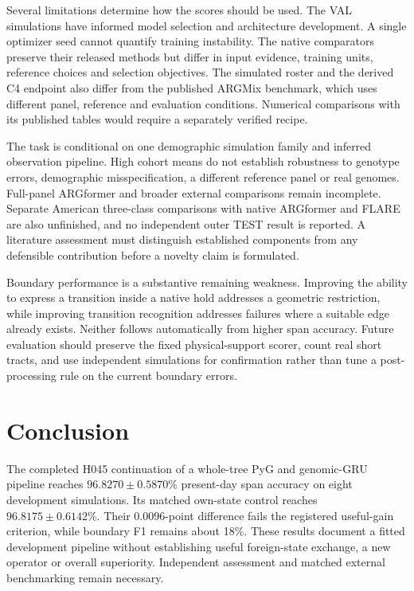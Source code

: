 \documentclass[letterpaper]{article}
\begin{document}
Several limitations determine how the scores should be used. The VAL simulations have informed model selection and architecture development. A single optimizer seed cannot quantify training instability. The native comparators preserve their released methods but differ in input evidence, training units, reference choices and selection objectives. The simulated roster and the derived C4 endpoint also differ from the published ARGMix benchmark, which uses different panel, reference and evaluation conditions. Numerical comparisons with its published tables would require a separately verified recipe.

The task is conditional on one demographic simulation family and inferred observation pipeline. High cohort means do not establish robustness to genotype errors, demographic misspecification, a different reference panel or real genomes. Full-panel ARGformer and broader external comparisons remain incomplete. Separate American three-class comparisons with native ARGformer and FLARE are also unfinished, and no independent outer TEST result is reported. A literature assessment must distinguish established components from any defensible contribution before a novelty claim is formulated.

Boundary performance is a substantive remaining weakness. Improving the ability to express a transition inside a native hold addresses a geometric restriction, while improving transition recognition addresses failures where a suitable edge already exists. Neither follows automatically from higher span accuracy. Future evaluation should preserve the fixed physical-support scorer, count real short tracts, and use independent simulations for confirmation rather than tune a post-processing rule on the current boundary errors.

\section{Conclusion}
The completed H045 continuation of a whole-tree PyG and genomic-GRU pipeline reaches $96.8270\pm0.5870\%$ present-day span accuracy on eight development simulations. Its matched own-state control reaches $96.8175\pm0.6142\%$. Their 0.0096-point difference fails the registered useful-gain criterion, while boundary F1 remains about 18\%. These results document a fitted development pipeline without establishing useful foreign-state exchange, a new operator or overall superiority. Independent assessment and matched external benchmarking remain necessary.
\end{document}
